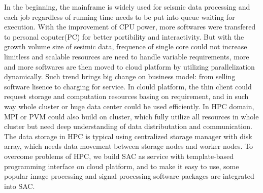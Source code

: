 In the beginning, the mainframe is widely used for seismic data processing and each job regardless of running time needs to be put into queue waiting for execution. With the improvement of CPU power, more softwares were transfered to personal coputer(PC) for better portibility and interactivity. But with the growth volume size of sesimic data, frequence of single core could not increase limitless and scalable resources are need to handle variable requirements, more and more softwares are then moved to cloud platform by utilizing parallelization dynamically. Such trend brings big change on business model: from selling software lisence to charging for service. In clould platform, the thin client could request storage and computation resources basing on requirement, and in such way whole cluster or huge data center could be used efficiently. In HPC domain, MPI or PVM could also build on cluster, which fully utilize all resources in whole cluster but need deep understanding of data distributation and communication. The data storage in HPC is typical using centralized storage manager with disk array, which needs data movement between storage nodes and worker nodes. To overcome problems of HPC, we build SAC as service with template-based programming interface on cloud platform, and to make it easy to use, some popular image processing and signal processing software packages are integrated into SAC.  

